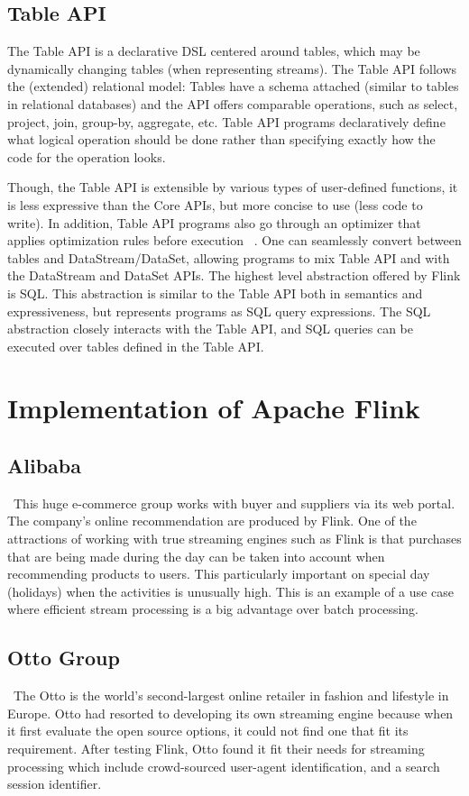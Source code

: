 \documentclass[9pt,twocolumn,twoside]{../../styles/osajnl}
\begin{document}
\subsection{ Table API}

The Table API is a declarative DSL centered around tables, which may be dynamically changing tables (when representing streams). The Table API follows the (extended) relational model: Tables have a schema attached (similar to tables in relational databases) and the API offers comparable operations, such as select, project, join, group-by, aggregate, etc. Table API programs declaratively define what logical operation should be done rather than specifying exactly how the code for the operation looks.

Though, the Table API is extensible by various types of user-defined functions, it is less expressive than the Core APIs, but more concise to use (less code to write). In addition, Table API programs also go through an optimizer that applies optimization rules before execution ~\cite{article-flink}. One can seamlessly convert between tables and DataStream/DataSet, allowing programs to mix Table API and with the DataStream and DataSet APIs. The highest level abstraction offered by Flink is SQL. This abstraction is similar to the Table API both in semantics and expressiveness, but represents programs as SQL query expressions. The SQL abstraction closely interacts with the Table API, and SQL queries can be executed over tables defined in the Table API.

\section{Implementation of Apache Flink }
\subsection{Alibaba}
~\cite{book-flink}This huge e-commerce group works with buyer and suppliers via its web portal. The company’s online recommendation are produced by Flink. One of the attractions of working with true streaming engines such as Flink is that purchases that are being made during the day can be taken into account when recommending products to users. This particularly important on special day (holidays) when the activities is unusually high. This is an example of a use case where efficient stream processing is a big advantage over batch processing.

\subsection{Otto Group}
~\cite{book-flink}The Otto is the world’s second-largest online retailer in fashion and lifestyle in Europe.  Otto had resorted to developing its own streaming engine because when it first evaluate the open source options, it could not find one that fit its requirement. After testing Flink, Otto found it fit their needs for streaming processing which include crowd-sourced user-agent identification, and a search session identifier.
\end{document}
